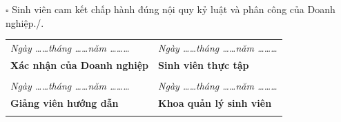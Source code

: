 \documentclass[12pt]{article}
\begin{document}
\noindent $\square$ Sinh viên cam kết chấp hành đúng nội quy kỷ luật và phân công của Doanh nghiệp./.

\vspace{0.5cm}

\noindent
\begin{tabularx}{\textwidth}{@{}X X@{}}
\centering \textit{Ngày \dots\dots tháng \dots\dots năm \dots\dots\dots} & \centering \textit{Ngày \dots\dots tháng \dots\dots năm \dots\dots\dots} \tabularnewline
\centering \textbf{Xác nhận của Doanh nghiệp} & \centering \textbf{Sinh viên thực tập} \tabularnewline
\vspace{2.5cm} & \vspace{2.5cm} \tabularnewline
\centering \textit{Ngày \dots\dots tháng \dots\dots năm \dots\dots\dots} & \centering \textit{Ngày \dots\dots tháng \dots\dots năm \dots\dots\dots} \tabularnewline
\centering \textbf{Giảng viên hướng dẫn} & \centering \textbf{Khoa quản lý sinh viên} \tabularnewline
\vspace{2.5cm} & \vspace{2.5cm} \tabularnewline
\end{tabularx}
\end{document}
